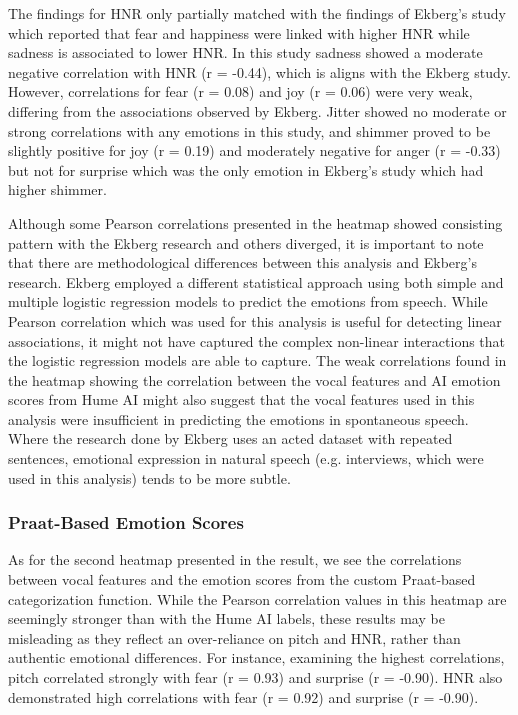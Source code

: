 The findings for HNR only partially matched with the findings of Ekberg’s study which reported that fear and happiness were linked with higher HNR while sadness is associated to lower HNR. 
In this study sadness showed a moderate negative correlation with HNR (r = -0.44), which is aligns with the Ekberg study. However, correlations for fear (r = 0.08) and joy (r = 0.06) were very weak, differing from the associations observed by Ekberg.
Jitter showed no moderate or strong correlations with any emotions in this study, and shimmer proved to be slightly positive for joy (r = 0.19) and moderately negative for anger (r = -0.33) but not for surprise which was the only emotion in Ekberg’s study which had higher shimmer.

Although some Pearson correlations presented in the heatmap showed consisting pattern with the Ekberg research and others diverged, it is important to note that there are methodological differences between this analysis and Ekberg’s research. Ekberg employed a different statistical approach using both simple and multiple logistic regression models to predict the emotions from speech. While Pearson correlation which was used for this analysis is useful for detecting linear associations, it might not have captured the complex non-linear interactions that the logistic regression models are able to capture.
The weak correlations found in the heatmap showing the correlation between the vocal features and AI emotion scores from Hume AI might also suggest that the vocal features used in this analysis were insufficient in predicting the emotions in spontaneous speech. Where the research done by Ekberg uses an acted dataset with repeated sentences, emotional expression in natural speech (e.g. interviews, which were used in this analysis) tends to be more subtle.

\subsubsection{Praat-Based Emotion Scores}
As for the second heatmap presented in the result, we see the correlations between vocal features and the emotion scores from the custom Praat-based categorization function. While the Pearson correlation values in this heatmap are seemingly stronger than with the Hume AI labels, these results may be misleading as they reflect an over-reliance on pitch and HNR, rather than authentic emotional differences.
For instance, examining the highest correlations, pitch correlated strongly with fear (r = 0.93) and surprise (r = -0.90). HNR also demonstrated high correlations with fear (r = 0.92) and surprise (r = -0.90). 

